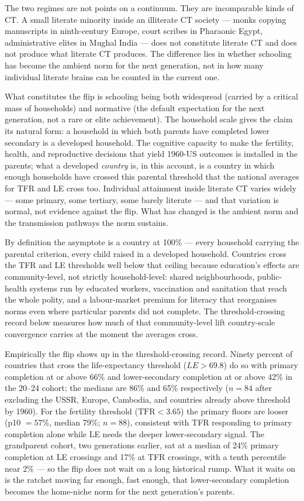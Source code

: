 \documentclass[12pt,letterpaper]{article}
\begin{document}
The two regimes are not points on a continuum. They are incomparable
kinds of CT. A small literate minority inside an illiterate CT
society --- monks copying manuscripts in ninth-century Europe, court
scribes in Pharaonic Egypt, administrative elites in Mughal India ---
does not constitute literate CT and does not produce what literate CT
produces. The difference lies in whether schooling has become the
ambient norm for the next generation, not in how many individual
literate brains can be counted in the current one.

What constitutes the flip is schooling being both widespread (carried
by a critical mass of households) and normative (the default
expectation for the next generation, not a rare or elite achievement).
The household scale gives the claim its natural form: a household
in which both parents have completed lower secondary is a developed
household. The cognitive capacity to make the fertility, health, and
reproductive decisions that yield 1960-US outcomes is installed in
the parents; what a developed \emph{country} is, in this account, is
a country in which enough households have crossed this parental
threshold that the national averages for TFR and LE cross too.
Individual attainment inside literate CT varies widely --- some
primary, some tertiary, some barely literate --- and that variation
is normal, not evidence against the flip. What has changed is the
ambient norm and the transmission pathways the norm sustains.

By definition the asymptote is a country at 100\% --- every
household carrying the parental criterion, every child raised in a
developed household. Countries cross the TFR and LE thresholds well
below that ceiling because education's effects are community-level,
not strictly household-level: shared neighbourhoods, public-health
systems run by educated workers, vaccination and sanitation that
reach the whole polity, and a labour-market premium for literacy
that reorganises norms even where particular parents did not
complete. The threshold-crossing record below measures how much of
that community-level lift country-scale convergence carries at
the moment the averages cross.

Empirically the flip shows up in the threshold-crossing record.
Ninety percent of countries that cross the life-expectancy threshold
($LE > 69.8$) do so with primary completion at or above 66\% and
lower-secondary completion at or above 42\% in the 20--24 cohort; the
medians are 86\% and 65\% respectively ($n = 84$ after excluding the
USSR, Europe, Cambodia, and countries already above threshold by 1960). For the fertility
threshold ($\mathrm{TFR} < 3.65$) the primary floors are looser (p10
$= 57\%$, median 79\%; $n = 88$), consistent with TFR
responding to primary completion alone while LE needs the deeper
lower-secondary signal. The grandparent cohort, two generations
earlier, sat at a median of 24\% primary completion at LE crossings
and 17\% at TFR crossings, with a tenth percentile near 2\% --- so
the flip does not wait on a long historical runup. What it waits on
is the ratchet moving far enough, fast enough, that lower-secondary
completion becomes the home-niche norm for the next generation's
parents.
\end{document}
